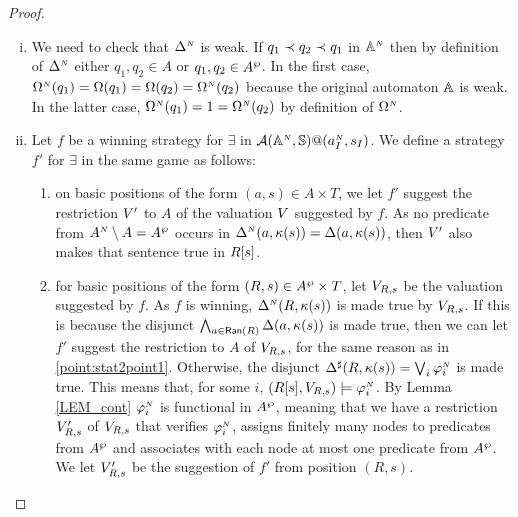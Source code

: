 \begin{proof}
\begin{enumerate}[(i)]
  \item We need to check that $\Delta^{{\scriptscriptstyle N}}$ is weak. If $q_1 \prec q_2 \prec q_1$ in $\mathbb{A}^{{\scriptscriptstyle N}}$ then by definition of $\Delta^{{\scriptscriptstyle N}}$ either $q_1, q_2 \in A$ or $q_1, q_2 \in A^{\wp}$. In the first case, $\Omega^{{\scriptscriptstyle N}}(q_1) = \Omega(q_1) = \Omega(q_2) = \Omega^{{\scriptscriptstyle N}}(q_2)$ because the original automaton $\mathbb{A}$ is weak. In the latter case, $\Omega^{{\scriptscriptstyle N}}(q_1) = 1 = \Omega^{{\scriptscriptstyle N}}(q_2)$ by definition of $\Omega^{{\scriptscriptstyle N}}$. 
\item Let $f$ be a winning strategy for $\exists$ in $\mathcal{A}(\mathbb{A}^{{\scriptscriptstyle N}},\mathbb{S})@(a_I^{{\scriptscriptstyle N}},s_I)$. We define a strategy $f'$ for $\exists$ in the same game as follows:
      \begin{enumerate}[label=(\alph*),ref=\alph*]
        \item on basic positions of the form $(a,s) \in A\times T$, we let $f'$ suggest the restriction $V'$ to $A$ of the valuation $V$ suggested by $f$. As no predicate from $A^{{\scriptscriptstyle N}}\setminus A =A^{\wp}$ occurs in $\Delta^{{\scriptscriptstyle N}}(a,\kappa(s)) = \Delta(a,\kappa(s))$, then $V'$ also makes that sentence true in $R[s]$.
        \begin{comment} With minimality
        on basic positions of the form $(a,s) \in A\times T$, $f'$ is defined as $f$. Indeed, as no predicate from $\shA$ occurs in $\Delta^{\noet}(a,\V(s))$, we can assume that the valuation suggested by $f$ does not assign any of them to nodes in $\R{s}$.
        \end{comment}
        \label{point:stat2point1}
        \item for basic positions of the form $(R,s) \in A^{\wp} \times T$, let $V_{R,s}$ be the valuation suggested by $f$. As $f$ is winning, $\Delta^{{\scriptscriptstyle N}}(R,\kappa(s))$ is made true by $V_{R,s}$. If this is because the disjunct $\bigwedge_{a \in \mathsf{Ran}(R)} \Delta(a,\kappa(s))$ is made true, then we can let $f'$ suggest the restriction to $A$ of $V_{R,s}$, for the same reason as in \eqref{point:stat2point1}. Otherwise, the disjunct $\Delta^{\sharp}(R,\kappa(s)) = \bigvee_{i}\varphi_i^{{\scriptscriptstyle N}}$ is made true. This means that, for some $i$, $(R[s], V_{R,s}) \models \varphi_i^{{\scriptscriptstyle N}}$. By Lemma \ref{LEM_cont} $\varphi_i^{{\scriptscriptstyle N}}$ is functional in $A^{\wp}$, meaning that we have a restriction $V_{R,s}'$ of $V_{R,s}$ that verifies $\varphi_i^{{\scriptscriptstyle N}}$, assigns finitely many nodes to predicates from $A^{\wp}$ and associates with each node at most one predicate from $A^{\wp}$. We let $V_{R,s}'$ be the suggestion of $f'$ from position $(R,s)$.

\end{enumerate}
\end{enumerate}
\end{proof}
